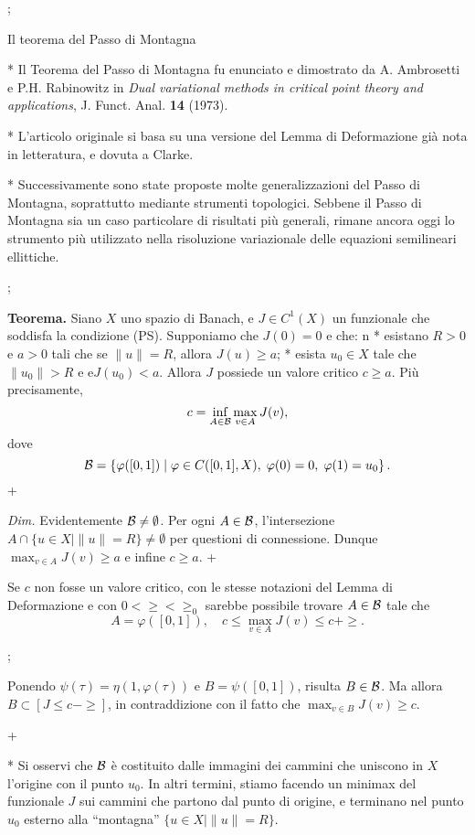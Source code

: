 \pg;

\sec Il teorema del Passo di Montagna

* Il Teorema del Passo di Montagna fu enunciato e dimostrato da
  A. Ambrosetti e P.H. Rabinowitz in {\em Dual variational methods in
  critical point theory and applications}, J. Funct. Anal. {\bf 14}
  (1973).

* L'articolo originale si basa su una versione del Lemma di
  Deformazione gi\`a nota in letteratura, e dovuta a Clarke.

* Successivamente sono state proposte molte generalizzazioni del Passo
  di Montagna, soprattutto mediante strumenti topologici. Sebbene il
  Passo di Montagna sia un caso particolare di risultati pi\`u
  generali, rimane ancora oggi lo strumento pi\`u utilizzato nella
  risoluzione variazionale delle equazioni semilineari ellittiche.

\pg;

{\bf Teorema.} Siano $X$ uno spazio di Banach, e $J \in C^1(X)$ un
funzionale che soddisfa la condizione (PS). Supponiamo che $J(0)=0$ e
che:
\begitems
\style n
* esistano $R>0$ e $a>0$ tali che se
$\|u\|=R$, allora $J(u) \geq a$;
* esista $u_0 \in X$ tale che
$\|u_0\|>R$ e e$J(u_0)<a$.
\enditems
Allora $J$ possiede un valore critico $c\geq a$. Pi\`u precisamente,
$$
c = \inf_{A \in {\cal B}} \max_{v \in A} J(v),
$$
dove
$$
{\cal B} = \left\{ \varphi([0,1]) \mid \varphi \in C([0,1],X),\;
\varphi(0)=0,\; \varphi(1)=u_0 \right\}.
$$
\pg+

{\em Dim.} Evidentemente ${\cal B} \neq \emptyset$.  Per ogni $A \in
{\cal B}$, l'intersezione $A \cap \{u \in X \mid \|u\|=R\} \neq
\emptyset$ per questioni di connessione. Dunque $\max_{v \in A} J(v)
\geq a$ e infine $c \geq a$.  \pg+

Se $c$ non fosse un valore critico, con le stesse notazioni del Lemma
di Deformazione e con $0<\ge < \ge_0$ sarebbe possibile trovare $A \in
{\cal B}$ tale che
$$
A = \varphi([0,1]), \quad c \leq \max_{v \in A} J(v) \leq c+\ge.
$$

\pg;

Ponendo $\psi(\tau) = \eta(1,\varphi(\tau))$ e $B = \psi([0,1])$,
risulta $B \in {\cal B}$. Ma allora $B \subset [J \leq c-\ge]$, in
contraddizione con il fatto che $\max_{v \in B} J(v) \geq c$.

\pg+

* Si osservi che ${\cal B}$ \`e costituito dalle immagini dei cammini
  che uniscono in $X$ l'origine con il punto $u_0$. In altri termini,
  stiamo facendo un minimax del funzionale $J$ sui cammini che partono
  dal punto di origine, e terminano nel punto $u_0$ esterno alla
  ``montagna'' $\{u \in X \mid \|u\|=R\}$.

